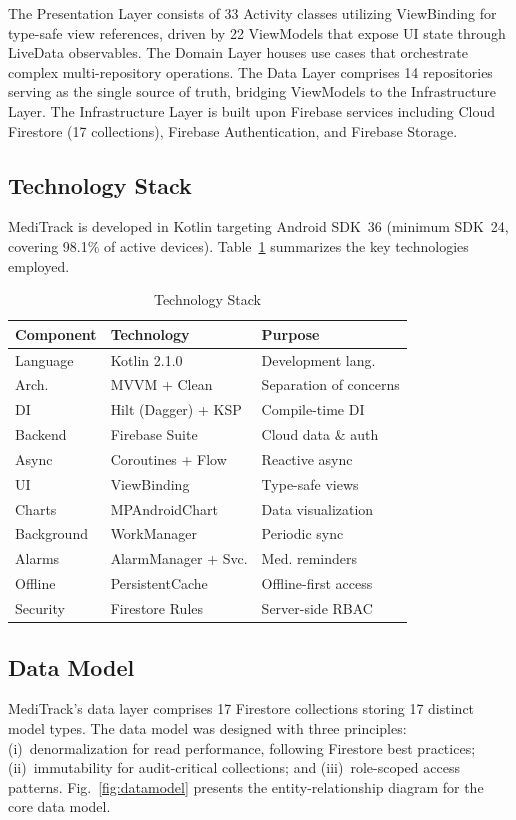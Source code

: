 \documentclass[journal,onecolumn,web]{ieeecolor}
\begin{document}
The Presentation Layer consists of 33 Activity classes
utilizing ViewBinding for type-safe view references,
driven by 22 ViewModels that expose UI state through
LiveData observables. The Domain Layer houses use cases
that orchestrate complex multi-repository operations.
The Data Layer comprises 14 repositories serving as
the single source of truth, bridging ViewModels to the
Infrastructure Layer. The Infrastructure Layer is built
upon Firebase services including Cloud Firestore
(17 collections), Firebase Authentication, and
Firebase Storage.

\subsection{Technology Stack}
MediTrack is developed in Kotlin targeting Android
SDK~36 (minimum SDK~24, covering 98.1\% of active
devices). Table~\ref{tab:techstack} summarizes the key
technologies employed.

\begin{table}[!t]
\caption{Technology Stack}
\label{tab:techstack}
\centering\small
\begin{tabular}{p{1.8cm} p{2.6cm} p{2.5cm}}
\toprule
{\bf Component} & {\bf Technology}
& {\bf Purpose} \\
\midrule
Language & Kotlin 2.1.0
& Development lang. \\
Arch. & MVVM + Clean
& Separation of concerns \\
DI & Hilt (Dagger) + KSP
& Compile-time DI \\
Backend & Firebase Suite
& Cloud data \& auth \\
Async & Coroutines + Flow
& Reactive async \\
UI & ViewBinding
& Type-safe views \\
Charts & MPAndroidChart
& Data visualization \\
Background & WorkManager
& Periodic sync \\
Alarms & AlarmManager + Svc.
& Med. reminders \\
Offline & PersistentCache
& Offline-first access \\
Security & Firestore Rules
& Server-side RBAC \\
\bottomrule
\end{tabular}
\end{table}

\subsection{Data Model}
MediTrack's data layer comprises 17 Firestore
collections storing 17 distinct model types. The data
model was designed with three principles:
(i)~denormalization for read performance, following
Firestore best practices; (ii)~immutability for
audit-critical collections; and (iii)~role-scoped
access patterns. Fig.~\ref{fig:datamodel} presents
the entity-relationship diagram for the core data
model.
\end{document}
